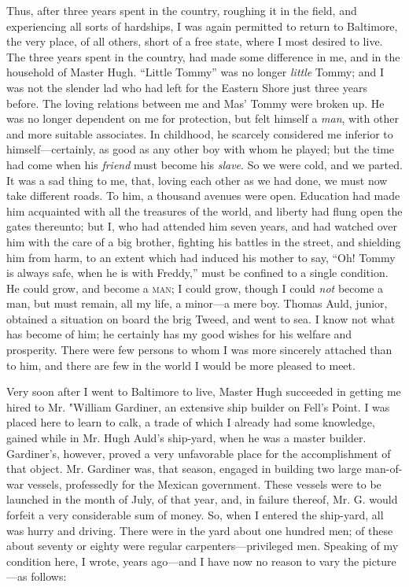 Thus, after three years spent in the country, roughing it in the field,
and experiencing all sorts of hardships, I was again permitted to return
to Baltimore, the very place, of all others, short of a free state,
where I {}most desired to live. The three years spent in the country,
had made some difference in me, and in the household of Master Hugh.
``Little Tommy'' was no longer \emph{little} Tommy; and I was not the
slender lad who had left for the Eastern Shore just three years before.
The loving relations between me and Mas' Tommy were broken up. He was no
longer dependent on me for protection, but felt himself a \emph{man},
with other and more suitable associates. In childhood, he scarcely
considered me inferior to himself---certainly, as good as any other boy
with whom he played; but the time had come when his \emph{friend} must
become his \emph{slave}. So we were cold, and we parted. It was a sad
thing to me, that, loving each other as we had done, we must now take
different roads. To him, a thousand avenues were open. Education had
made him acquainted with all the treasures of the world, and liberty had
flung open the gates thereunto; but I, who had attended him seven years,
and had watched over him with the care of a big brother, fighting his
battles in the street, and shielding him from harm, to an extent which
had induced his mother to say, ``Oh! Tommy is always safe, when he is
with Freddy,'' must be confined to a single condition. He could grow,
and become a \textsc{man}; I could grow, though I could \emph{not}
become a man, but must remain, all my life, a minor---a mere boy. Thomas
Auld, junior, obtained a situation on board the brig Tweed, and went to
sea. I know not what has become of him; he certainly has my good wishes
for his welfare and prosperity. There were few persons to whom I was
more sincerely attached {}than to him, and there are few in the world I
would be more pleased to meet.

Very soon after I went to Baltimore to live, Master Hugh succeeded in
getting me hired to Mr. "William Gardiner, an extensive ship builder on
Fell's Point. I was placed here to learn to calk, a trade of which I
already had some knowledge, gained while in Mr. Hugh Auld's ship-yard,
when he was a master builder. Gardiner's, however, proved a very
unfavorable place for the accomplishment of that object. Mr. Gardiner
was, that season, engaged in building two large man-of-war vessels,
professedly for the Mexican government. These vessels were to be
launched in the month of July, of that year, and, in failure thereof,
Mr. G. would forfeit a very considerable sum of money. So, when I
entered the ship-yard, all was hurry and driving. There were in the yard
about one hundred men; of these about seventy or eighty were regular
carpenters---privileged men. Speaking of my condition here, I wrote,
years ago---and I have now no reason to vary the picture---as follows:

